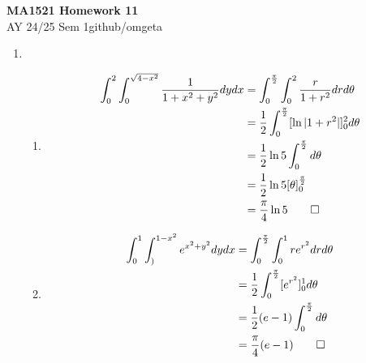 \documentclass[12pt, a4paper]{article}
\newcommand{\mytitle}{MA1521 Homework 11}
\newcommand{\myauthor}{github/omgeta}
\newcommand{\mydate}{AY 24/25 Sem 1}
\begin{document}
\raggedright
\footnotesize
\begin{center}
{\normalsize{\textbf{\mytitle}}} \\
{\footnotesize{\mydate\hspace{2pt}\textemdash\hspace{2pt}\myauthor}}
\end{center}

\begin{enumerate}[Q\arabic*.]
  \item 
    \begin{enumerate}[(\alph*)]
      \item 
        \begin{align*}
          \int^2_0 \int^{\sqrt{4-x^2}}_0 \frac{1}{1+x^2+y^2} dydx &= \int^{\frac{\pi}{2}}_0 \int^2_0 \frac{r}{1+r^2} drd\theta\\
                                                                  &= \frac{1}{2}\int^{\frac{\pi}{2}}_0 [\ln|1+r^2|]^2_0 d\theta\\
                                                                  &= \frac{1}{2}\ln5 \int^{\frac{\pi}{2}}_0 d\theta\\
                                                                  &= \frac{1}{2}\ln5[\theta]^{\frac{\pi}{2}}_0\\
                                                                  &= \frac{\pi}{4}\ln5 \qed
        \end{align*}

      \item 
        \begin{align*}
          \int^1_0 \int^{1-x^2}_) e^{x^2+y^2}dydx &= \int^{\frac{\pi}{2}}_0 \int^1_0 re^{r^2} drd\theta\\
                                                  &= \frac{1}{2}\int^{\frac{\pi}{2}}_0 [e^{r^2}]^1_0 d\theta\\
                                                  &= \frac{1}{2}(e-1)\int^{\frac{\pi}{2}}_0 d\theta\\
                                                  &= \frac{\pi}{4}(e-1) \qed
        \end{align*}
    \end{enumerate}


\end{enumerate}
\end{document}
